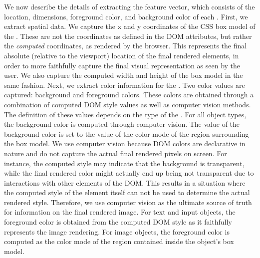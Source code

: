 
We now describe the details of extracting the feature vector, 
which consists of the location, dimensions, foreground color, and background color
of each \vizobj. 
First, we extract spatial data.
We capture the x and y coordinates of the CSS box model of the \vizobj.
These are not the coordinates as defined in the DOM attributes,
but rather the \emph{computed} coordinates, as rendered by the browser.
This represents the final absolute (relative to the viewport) location
of the final rendered elements, in order to more faithfully capture the 
final visual representation as seen by the user.
We also capture the computed width and height of the box model in the same fashion.
%
Next, we extract color information for the \vizobjs.
Two color values are captured: background and foreground colors.
These colors are obtained through a combination of computed DOM style
values as well as computer vision methods.
The definition of these values depends on the type of the \vizobj.
For all object types, 
the background color is computed through computer vision.
The value of the background color is set to the value of the color mode 
of the region surrounding the box model. 
We use computer vision because DOM colors are declarative in nature
and do not capture the actual final rendered pixels on screen.
For instance, the computed style may indicate that the background
is transparent, while the final rendered color might actually end up being 
not transparent due to interactions with other elements of the DOM. 
This results in a situation where the computed style of 
the element itself can not be used to determine the actual rendered style.
Therefore, we use computer vision as the ultimate source of truth for 
information on the final rendered image.
For text and input objects, the foreground color is obtained from
the computed DOM style as it faithfully represents the image rendering.
For image objects, the foreground color is computed as
the color mode of the region contained inside the object's box model. 

